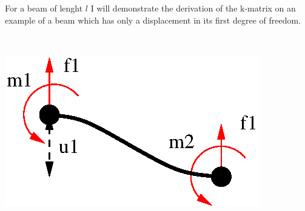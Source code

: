 \begin{minipage}{\textwidth}
    \begin{minipage}[t]{0.5\textwidth}
     
     For a beam of lenght $l$ I will demonstrate the derivation of the k-matrix on an example of a beam which has only a displacement in its first degree of freedom.
    \end{minipage}
    \hfill
    \begin{minipage}[t]{0.5\textwidth}				%
      ~\\[-1ex]%
      \centerline{\includegraphics[scale=1]{deformBar1.eps}}
    \end{minipage}
  \end{minipage}